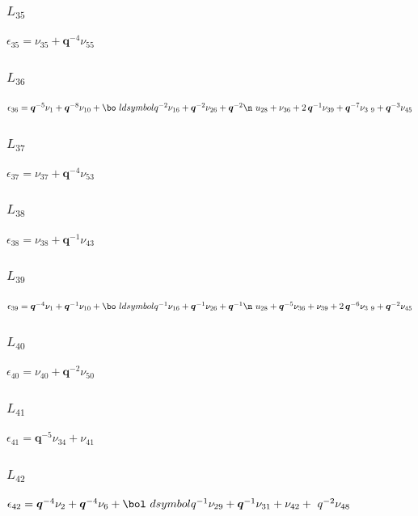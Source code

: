 \subsubsection*{$L_{35}$}
$
\epsilon_{35} = \nu_{35} + \boldsymbol{q}^{-4}\nu_{55}
$

\subsubsection*{$L_{36}$}
$
\epsilon_{36} = \boldsymbol{q}^{-5}\nu_{1} + \boldsymbol{q}^{-8}\nu_{10} + \bo\
ldsymbol{q}^{-2}\nu_{16} + \boldsymbol{q}^{-2}\nu_{26} + \boldsymbol{q}^{-2}\n\
u_{28} + \nu_{36} + 2\,\boldsymbol{q}^{-1}\nu_{39} + \boldsymbol{q}^{-7}\nu_{3\
9} + \boldsymbol{q}^{-3}\nu_{45}
$

\subsubsection*{$L_{37}$}
$
\epsilon_{37} = \nu_{37} + \boldsymbol{q}^{-4}\nu_{53}
$

\subsubsection*{$L_{38}$}
$
\epsilon_{38} = \nu_{38} + \boldsymbol{q}^{-1}\nu_{43}
$

\subsubsection*{$L_{39}$}
$
\epsilon_{39} = \boldsymbol{q}^{-4}\nu_{1} + \boldsymbol{q}^{-1}\nu_{10} + \bo\
ldsymbol{q}^{-1}\nu_{16} + \boldsymbol{q}^{-1}\nu_{26} + \boldsymbol{q}^{-1}\n\
u_{28} + \boldsymbol{q}^{-5}\nu_{36} + \nu_{39} + 2\,\boldsymbol{q}^{-6}\nu_{3\
9} + \boldsymbol{q}^{-2}\nu_{45}
$

\subsubsection*{$L_{40}$}
$
\epsilon_{40} = \nu_{40} + \boldsymbol{q}^{-2}\nu_{50}
$

\subsubsection*{$L_{41}$}
$
\epsilon_{41} = \boldsymbol{q}^{-5}\nu_{34} + \nu_{41}
$

\subsubsection*{$L_{42}$}
$
\epsilon_{42} = \boldsymbol{q}^{-4}\nu_{2} + \boldsymbol{q}^{-4}\nu_{6} + \bol\
dsymbol{q}^{-1}\nu_{29} + \boldsymbol{q}^{-1}\nu_{31} + \nu_{42} + \boldsymbol\
{q}^{-2}\nu_{48}
$

